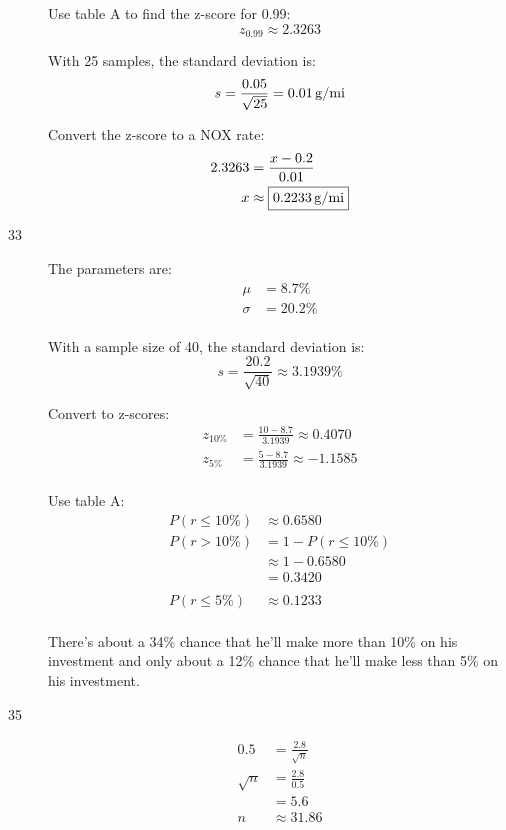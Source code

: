 \documentclass[letterpaper, landscape]{exam}
\begin{document}
\begin{description}
        Use table A to find the z-score for 0.99:
        \[
          z_{0.99} \approx 2.3263
        \]

        With 25 samples, the standard deviation is:
        \[
          s = \frac{0.05}{\sqrt{25}} = \unit[0.01]{g/mi}
        \]

        Convert the z-score to a NOX rate:
        \begin{align*}
          2.3263 & = \frac{x - 0.2}{0.01} \\
          x     & \approx \boxed{ \unit[0.2233]{g/mi} } \\
        \end{align*}

      \item[33]
        The parameters are:
        \begin{align*}
          \mu    & = 8.7\% \\
          \sigma & = 20.2\% \\
        \end{align*}

        With a sample size of 40, the standard deviation is:
        \[
          s = \frac{20.2}{\sqrt{40}} \approx 3.1939\%
        \]

        Convert to z-scores:
        \begin{align*}
          z_{10\%} & = \frac{10 - 8.7}{3.1939} \approx 0.4070 \\
          z_{5\%}  & = \frac{5 - 8.7}{3.1939} \approx -1.1585 \\
        \end{align*}

        Use table A:\@
        \begin{align*}
          P(r \leq 10\%) & \approx 0.6580 \\
          P(r > 10\%)    & = 1 - P(r \leq 10\%) \\
                         & \approx 1 - 0.6580 \\
                         & = \boxed{ 0.3420 } \\
          \\
          P(r \leq 5\%)  & \approx \boxed{ 0.1233 } \\
        \end{align*}

        There's about a 34\% chance that he'll make more than 10\% on his
        investment and only about a 12\% chance that he'll make less than 5\% on
        his investment.

      \item[35]
        \begin{align*}
          0.5      & = \frac{2.8}{\sqrt{n}} \\
          \sqrt{n} & = \frac{2.8}{0.5} \\
                   & = 5.6 \\
          n        & \approx 31.86 \\
        \end{align*}


\end{description}
\end{document}
